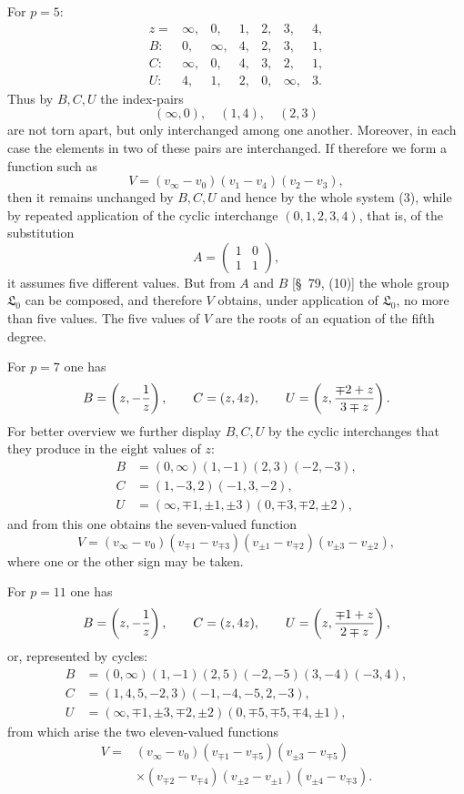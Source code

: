 \documentclass[11pt]{article}
\providecommand{\Lzero}{\mathfrak L_0}
\begin{document}
For $p=5$:
\[
\begin{array}{rrrrrrr}
z=&\infty,&0,&1,&2,&3,&4,\\
B:&0,&\infty,&4,&2,&3,&1,\\
C:&\infty,&0,&4,&3,&2,&1,\\
U:&4,&1,&2,&0,&\infty,&3.
\end{array}
\]
Thus by $B,C,U$ the index-pairs
\[
 (\infty,0),\quad(1,4),\quad(2,3)
\]
are not torn apart, but only interchanged among one another. Moreover, in each case the elements in two of these pairs are interchanged. If therefore we form a function such as
\begin{equation}
 V=(v_\infty-v_0)(v_1-v_4)(v_2-v_3),
\tag{9}
\end{equation}
then it remains unchanged by $B,C,U$ and hence by the whole system (3), while by repeated application of the cyclic interchange $(0,1,2,3,4)$, that is, of the substitution
\[
 A=\begin{pmatrix}1&0\\1&1\end{pmatrix},
\]
it assumes five different values. But from $A$ and $B$ [\S~79, (10)] the whole group $\Lzero$ can be composed, and therefore $V$ obtains, under application of $\Lzero$, no more than five values. The five values of $V$ are the roots of an equation of the fifth degree.

For $p=7$ one has
\[
 B=\left(z,-{1\over z}\right),\qquad C=(z,4z),\qquad
 U=\left(z,{\mp2+z\over 3\mp z}\right).
\]
For better overview we further display $B,C,U$ by the cyclic interchanges that they produce in the eight values of $z$:
\[
\begin{aligned}
B&=(0,\infty)(1,-1)(2,3)(-2,-3),\\
C&=(1,-3,2)(-1,3,-2),\\
U&=(\infty,\mp1,\pm1,\pm3)(0,\mp3,\mp2,\pm2),
\end{aligned}
\]
and from this one obtains the seven-valued function
\begin{equation}
 V=(v_\infty-v_0)(v_{\mp1}-v_{\mp3})(v_{\pm1}-v_{\mp2})(v_{\pm3}-v_{\pm2}),
\tag{10}
\end{equation}
where one or the other sign may be taken.

For $p=11$ one has
\[
 B=\left(z,-{1\over z}\right),\qquad C=(z,4z),\qquad
 U=\left(z,{\mp1+z\over 2\mp z}\right),
\]
or, represented by cycles:
\[
\begin{aligned}
B&=(0,\infty)(1,-1)(2,5)(-2,-5)(3,-4)(-3,4),\\
C&=(1,4,5,-2,3)(-1,-4,-5,2,-3),\\
U&=(\infty,\mp1,\pm3,\mp2,\pm2)(0,\mp5,\mp5,\mp4,\pm1),
\end{aligned}
\]
from which arise the two eleven-valued functions
\begin{equation}
\begin{aligned}
 V={}&(v_\infty-v_0)(v_{\mp1}-v_{\mp5})(v_{\pm3}-v_{\mp5})\\
 &\times(v_{\mp2}-v_{\mp4})(v_{\pm2}-v_{\pm1})(v_{\pm4}-v_{\mp3}).
\end{aligned}
\tag{11}
\end{equation}
\end{document}
